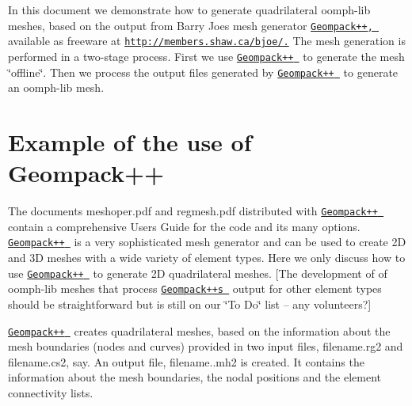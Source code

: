 In this document we demonstrate how to generate quadrilateral {\ttfamily oomph-\/lib} meshes, based on the output from Barry Joe\textquotesingle{}s mesh generator \href{http://members.shaw.ca/bjoe/}{\tt {\ttfamily Geompack++}, } available as freeware at \href{http://members.shaw.ca/bjoe/}{\tt http\+://members.\+shaw.\+ca/bjoe/.} The mesh generation is performed in a two-\/stage process. First we use \href{http://members.shaw.ca/bjoe/}{\tt {\ttfamily Geompack++} } to generate the mesh \char`\"{}offline\char`\"{}. Then we process the output files generated by \href{http://members.shaw.ca/bjoe/}{\tt {\ttfamily Geompack++} } to generate an {\ttfamily oomph-\/lib} mesh.



 

\hypertarget{index_geompack_use}{}\section{Example of the use of Geompack++}\label{index_geompack_use}
The documents {\ttfamily meshoper.\+pdf} and {\ttfamily regmesh.\+pdf} distributed with \href{http://members.shaw.ca/bjoe/}{\tt {\ttfamily Geompack++} } contain a comprehensive User\textquotesingle{}s Guide for the code and its many options. \href{http://members.shaw.ca/bjoe/}{\tt {\ttfamily Geompack++} } is a very sophisticated mesh generator and can be used to create 2D and 3D meshes with a wide variety of element types. Here we only discuss how to use \href{http://members.shaw.ca/bjoe/}{\tt {\ttfamily Geompack++} } to generate 2D quadrilateral meshes. \mbox{[}The development of of {\ttfamily oomph-\/lib} meshes that process \href{http://members.shaw.ca/bjoe/}{\tt {\ttfamily Geompack++\textquotesingle{}s} } output for other element types should be straightforward but is still on our \char`\"{}\+To Do\char`\"{} list -- any volunteers?\mbox{]}

\href{http://members.shaw.ca/bjoe/}{\tt {\ttfamily Geompack++} } creates quadrilateral meshes, based on the information about the mesh boundaries (nodes and curves) provided in two input files, {\ttfamily filename.\+rg2} and {\ttfamily filename.\+cs2}, say. An output file, {\ttfamily filename..\+mh2} is created. It contains the information about the mesh boundaries, the nodal positions and the element connectivity lists.



